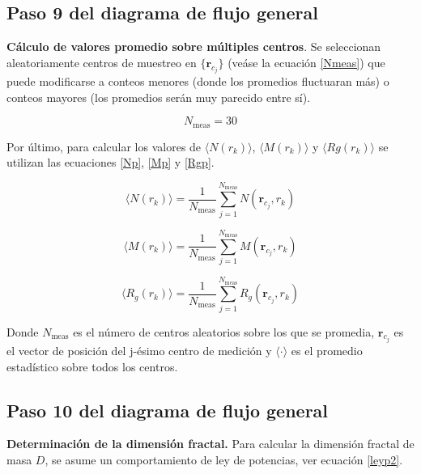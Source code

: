 	 	
 	\subsection{Paso 9 del diagrama de flujo general}
 	
 	\textbf{C\'{a}lculo de valores promedio sobre m\'{u}ltiples centros}. Se seleccionan aleatoriamente centros de muestreo en $\{\mathbf{r}_{c_j}\}$ (ve\'{a}se la ecuaci\'{o}n \ref{Nmeas}) que puede modificarse a conteos menores (donde los promedios fluctuaran m\'{a}s) o conteos mayores (los promedios ser\'{a}n muy parecido entre s\'{i}). 
 	
 	
 	\begin{equation}
 		N_{\text{meas}} = 30  
 		\label{Nmeas}
 	\end{equation}
 	
 	Por \'{u}ltimo, para calcular los valores de $\langle N(r_k) \rangle$, $\langle M(r_k) \rangle$ y $\langle Rg(r_k) \rangle$ se utilizan las ecuaciones \ref{Np}, \ref{Mp} y \ref{Rgp}.
 	
 	\begin{equation}
 		\langle N(r_k) \rangle = \frac{1}{N_{\text{meas}}} 
 		\sum_{j=1}^{N_{\text{meas}}} N(\mathbf{r}_{c_j}, r_k)
 		\label{Np}
 	\end{equation}
 	
 	\begin{equation}
 		\langle M(r_k) \rangle = \frac{1}{N_{\text{meas}}} 
 		\sum_{j=1}^{N_{\text{meas}}} M(\mathbf{r}_{c_j}, r_k)
 		\label{Mp}
 	\end{equation}
 	
 	\begin{equation}
 		\langle R_g(r_k) \rangle = \frac{1}{N_{\text{meas}}} 
 		\sum_{j=1}^{N_{\text{meas}}} R_g(\mathbf{r}_{c_j}, r_k)
 		\label{Rgp}
 	\end{equation}
 	
 	Donde $	N_{\text{meas}}$ es el n\'{u}mero de centros aleatorios sobre los que se promedia,
 	$\mathbf{r}_{c_j}$ es el vector de posici\'{o}n del j-\'{e}simo centro de medici\'{o}n y
 	$\langle\cdot\rangle$ es el promedio estad\'{i}stico sobre todos los centros.	

 	
 	\subsection{Paso 10 del diagrama de flujo general}
 	
 	\textbf{Determinaci\'{o}n de la dimensi\'{o}n fractal.}	 
 	Para calcular la dimensi\'{o}n fractal de masa $D$, 
 	se asume un comportamiento de ley de potencias, 
 	ver ecuaci\'{o}n \ref{leyp2}.
 	
